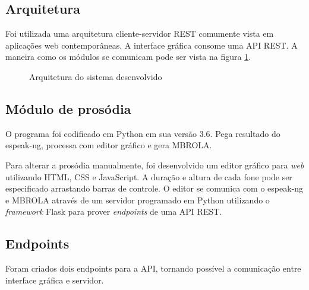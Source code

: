\subsection{Arquitetura}
Foi utilizada uma arquitetura cliente-servidor REST \cite{rest} comumente vista em aplicações web contemporâneas. A interface gráfica consome uma API REST. A maneira como os
módulos se comunicam pode ser vista na figura \ref{fig:arch}.

\begin{figure}[!htbp]
\centering
{}
\caption{Arquitetura do sistema desenvolvido}
\label{fig:arch}
\end{figure}

\subsection{Módulo de prosódia}

O programa foi codificado em Python em sua versão 3.6. Pega resultado do espeak-ng, processa com editor gráfico e gera MBROLA.

Para alterar a prosódia manualmente, foi desenvolvido um editor gráfico
para \emph{web} utilizando HTML, CSS e JavaScript. A duração e altura de cada
fone pode ser especificado arrastando barras de controle. O editor se comunica
com o espeak-ng e MBROLA através de um servidor programado em Python utilizando
o \emph{framework} Flask para prover \emph{endpoints} de uma API REST.

\subsection{Endpoints}
Foram criados dois endpoints para a API, tornando possível a comunicação entre
interface gráfica e servidor.

